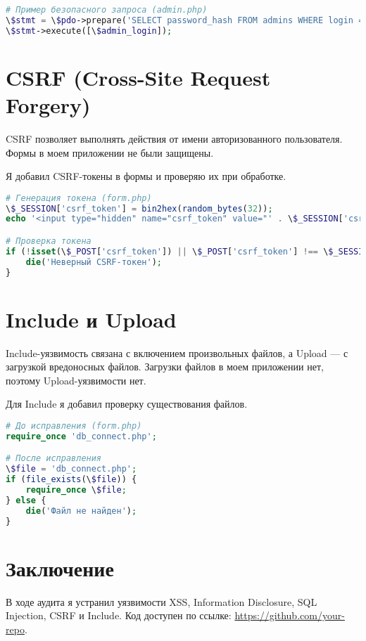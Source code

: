 \documentclass[a4paper,12pt]{article}
\begin{document}
\begin{lstlisting}[language=PHP, caption=Защита от SQL Injection]
# Пример безопасного запроса (admin.php)
\$stmt = \$pdo->prepare('SELECT password_hash FROM admins WHERE login = ?');
\$stmt->execute([\$admin_login]);
\end{lstlisting}

\section{CSRF (Cross-Site Request Forgery)}
CSRF позволяет выполнять действия от имени авторизованного пользователя. Формы в моем приложении не были защищены.

Я добавил CSRF-токены в формы и проверяю их при обработке.

\begin{lstlisting}[language=PHP, caption=Защита от CSRF]
# Генерация токена (form.php)
\$_SESSION['csrf_token'] = bin2hex(random_bytes(32));
echo '<input type="hidden" name="csrf_token" value="' . \$_SESSION['csrf_token'] . '">';

# Проверка токена
if (!isset(\$_POST['csrf_token']) || \$_POST['csrf_token'] !== \$_SESSION['csrf_token']) {
    die('Неверный CSRF-токен');
}
\end{lstlisting}

\section{Include и Upload}
Include-уязвимость связана с включением произвольных файлов, а Upload — с загрузкой вредоносных файлов. Загрузки файлов в моем приложении нет, поэтому Upload-уязвимости нет.

Для Include я добавил проверку существования файлов.

\begin{lstlisting}[language=PHP, caption=Защита от Include]
# До исправления (form.php)
require_once 'db_connect.php';

# После исправления
\$file = 'db_connect.php';
if (file_exists(\$file)) {
    require_once \$file;
} else {
    die('Файл не найден');
}
\end{lstlisting}

\section*{Заключение}
В ходе аудита я устранил уязвимости XSS, Information Disclosure, SQL Injection, CSRF и Include. Код доступен по ссылке: \url{https://github.com/your-repo}.
\end{document}
